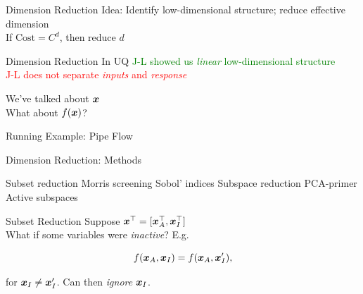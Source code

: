 \documentclass[14pt]{beamer}
\begin{document}

\begin{frame}{Dimension Reduction}
  Idea: Identify low-dimensional structure; reduce effective dimension \\
  If $\text{Cost} = C^d$, then reduce $d$
\end{frame}

\begin{frame}{Dimension Reduction \alert{In UQ}}
  \bigskip \textcolor{green}{J-L showed us \emph{linear} low-dimensional structure} \\
  \textcolor{red}{J-L does not separate \emph{inputs} and \emph{response}}

  \bigskip We've talked about $\boldsymbol{x}$ \\
  What about $f(\boldsymbol{x})$?
\end{frame}

\begin{frame}{Running Example: Pipe Flow}

\end{frame}

\begin{frame}{Dimension Reduction: Methods}
  \begin{outline}
    \1 Subset reduction
      \2 Morris screening
      \2 Sobol' indices
    \1 Subspace reduction
      \2 PCA-primer
      \2 Active subspaces
  \end{outline}
\end{frame}

\begin{frame}{Subset Reduction}
  Suppose $\boldsymbol{x}^{\top} = [\boldsymbol{x}_A^{\top}, \boldsymbol{x}_I^{\top}]$ \\
  What if some variables were \emph{inactive}? E.g.

  \begin{equation}
    f(\boldsymbol{x}_A, \boldsymbol{x}_I) = f(\boldsymbol{x}_A, \boldsymbol{x}'_I),
  \end{equation}

  \noindent for $\boldsymbol{x}_I \neq \boldsymbol{x}'_I$. Can then \emph{ignore} $\boldsymbol{x}_I$.
\end{frame}
\end{document}
